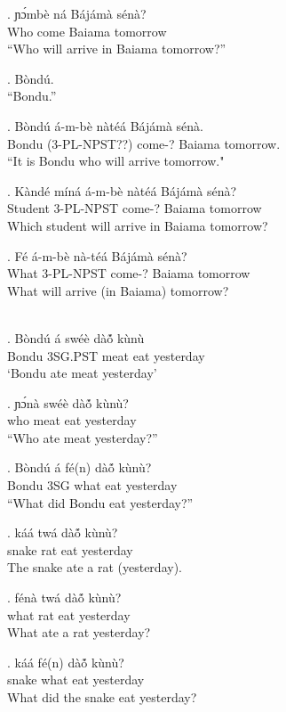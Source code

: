 \documentclass{assets/fieldnotes}
\begin{document}
\exg. ɲɔ́mbè ná Bájámà sénà?\\
Who come Baiama tomorrow\\
``Who will arrive in Baiama tomorrow?''

\ex. Bòndú.\\
``Bondu.''

\exg. Bòndú á-m-bè nàtéá Bájámà sénà.\\
Bondu (3-PL-NPST??) come-? Baiama tomorrow.\\
``It is Bondu who will arrive tomorrow."

\exg. Kàndé míná á-m-bè nàtéá Bájámà sénà?\\
Student 3-PL-NPST come-? Baiama tomorrow\\
Which student will arrive in Baiama tomorrow?

\exg. Fé á-m-bè nà-téá Bájámà sénà?\\
What 3-PL-NPST come-? Baiama tomorrow\\
What will arrive (in Baiama) tomorrow?%

\\
\exg. Bòndú á swéè dàó̃ kùnù\\
Bondu 3SG.PST meat eat yesterday \\%
    `Bondu ate meat yesterday'

\exg. ɲɔ́nà swéè dàó̃ kùnù?\\
who meat eat yesterday\\
``Who ate meat yesterday?''

\exg. Bòndú á fé(n) dàó̃ kùnù?\\
Bondu 3SG what eat yesterday\\
``What did Bondu eat yesterday?''\\

\exg. káá twá dàó̃ kùnù?\\
snake rat eat yesterday\\
The snake ate a rat (yesterday).

\exg. fénà twá dàó̃ kùnù?\\
what rat eat yesterday\\
What ate a rat yesterday?

\exg. káá fé(n) dàó̃ kùnù?\\
snake what eat yesterday\\
What did the snake eat yesterday?
\end{document}

